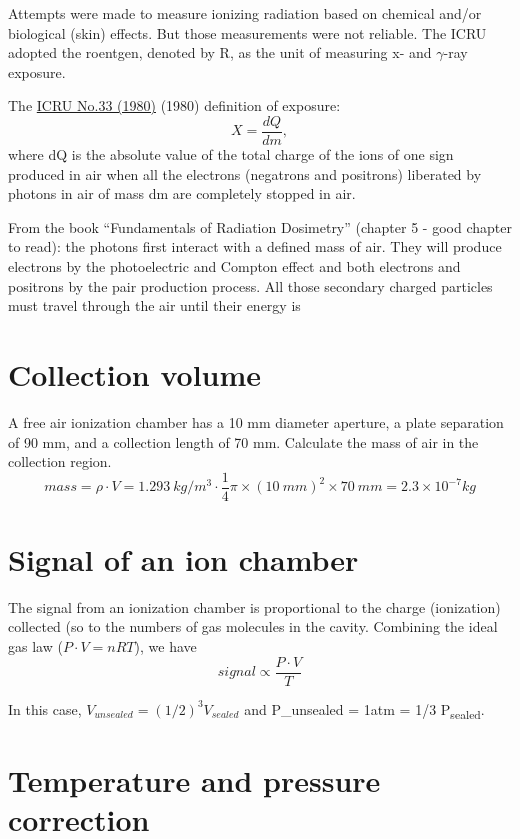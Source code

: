 \documentclass[]{book}
\theoremstyle{definition}
\theoremstyle{definition}
\theoremstyle{definition}
\theoremstyle{remark}
\begin{document}
Attempts were made to measure ionizing radiation based on chemical
and/or biological (skin) effects. But those measurements were not
reliable. The ICRU adopted the roentgen, denoted by R, as the unit of
measuring x- and \(\gamma\)-ray exposure.

The
\href{https://onlinelibrary.wiley.com/doi/abs/10.1002/jlcr.2580180918}{ICRU
No.33 (1980)} (1980) definition of exposure: \[X=\frac{dQ}{dm},\] where
dQ is the absolute value of the total charge of the ions of one sign
produced in air when all the electrons (negatrons and positrons)
liberated by photons in air of mass dm are completely stopped in air.

From the book ``Fundamentals of Radiation Dosimetry'' (chapter 5 - good
chapter to read): the photons first interact with a defined mass of air.
They will produce electrons by the photoelectric and Compton effect and
both electrons and positrons by the pair production process. All those
secondary charged particles must travel through the air until their
energy is

\section{Collection volume}\label{collection-volume}

A free air ionization chamber has a 10 mm diameter aperture, a plate
separation of 90 mm, and a collection length of 70 mm. Calculate the
mass of air in the collection region.
\[ mass = \rho \cdot V = 1.293\ kg/m^3 \cdot \frac{1}{4}\pi\times(10\ mm)^2\times 70\ mm = 2.3\times10^{-7} kg\]

\section{Signal of an ion chamber}\label{signal-of-an-ion-chamber}

The signal from an ionization chamber is proportional to the charge
(ionization) collected (so to the numbers of gas molecules in the
cavity. Combining the ideal gas law (\(P \cdot V = nRT\)), we have
\[signal \propto \frac{P \cdot V}{T} \]

In this case, \(V_{unsealed}=(1/2)^3 V_{sealed}\) and P\_unsealed = 1atm
= 1/3 P\textsubscript{sealed}.

\section{Temperature and pressure
correction}\label{temperature-and-pressure-correction}
\end{document}
